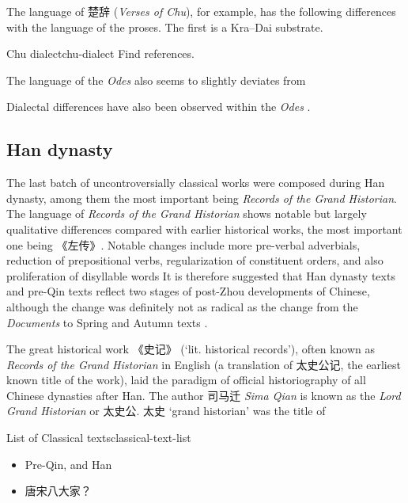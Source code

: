 \documentclass[UTF8, a4paper, oneside, scheme=plain, 12pt]{ctexrep}
\newcommand*{\citepages}[1]{pp.~{#1}}
\newcommand{\form}[1]{\emph{#1}}
\newcommand{\work}[1]{\textit{#1}}
\newcommand{\translate}[1]{`#1'}
\begin{document}
The language of 楚辞 (\work{Verses of Chu}), for example,
has the following differences with the language of the proses. 
The first is a Kra–Dai substrate.

\begin{todobox}{Chu dialect}{chu-dialect}
    Find references.
\end{todobox}

The language of the \work{Odes} also seems to slightly deviates from 

Dialectal differences have also been observed within the \work{Odes} \citep{list2017vowel}.



\subsection{Han dynasty}\label{sec:introduction.history.han}

The last batch of uncontroversially classical works were composed during Han dynasty,
among them the most important being \work{Records of the Grand Historian}.
The language of \form{Records of the Grand Historian} shows notable but largely qualitative differences
compared with earlier historical works,
the most important one being 《左传》.
Notable changes include more pre-verbal adverbials,
reduction of prepositional verbs,
regularization of constituent orders,
and also proliferation of disyllable words
It is therefore suggested that Han dynasty texts and pre-Qin texts 
reflect two stages of post-Zhou developments of Chinese,
although the change was definitely not as radical as the change 
from the \form{Documents} to Spring and Autumn texts 
\citep[\citepages{260-264}]{he2005shiji}.



The great historical work 《史记》 (\translate{lit. historical records}),
often known as \form{Records of the Grand Historian} in English
(a translation of 太史公记, the earliest known title of the work),
laid the paradigm of official historiography of all Chinese dynasties after Han.
The author 司马迁 \form{Sima Qian} is known as the \form{Lord Grand Historian} or 太史公.
太史 \translate{grand historian} was the title of

\begin{todobox}{List of Classical texts}{classical-text-list}
    \begin{itemize}
        \item Pre-Qin, and Han
        \item 唐宋八大家？
    \end{itemize}
\end{todobox}
\end{document}
